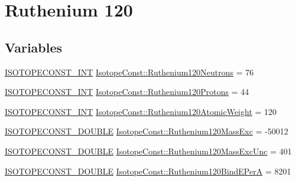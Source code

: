 \hypertarget{group___isotope_const-_ruthenium-_ru120}{}\section{Ruthenium 120}
\label{group___isotope_const-_ruthenium-_ru120}
\subsection*{Variables}
\begin{DoxyCompactItemize}
\item 
\mbox{\hyperlink{group___isotope_const-_macros_ga5f18360b3e99483a35c32d789e62621c}{I\+S\+O\+T\+O\+P\+E\+C\+O\+N\+S\+T\+\_\+\+I\+NT}} \mbox{\hyperlink{group___isotope_const-_ruthenium-_ru120_gab659be6d75e3a66b749142e8054c17be}{Isotope\+Const\+::\+Ruthenium120\+Neutrons}} = 76
\item 
\mbox{\hyperlink{group___isotope_const-_macros_ga5f18360b3e99483a35c32d789e62621c}{I\+S\+O\+T\+O\+P\+E\+C\+O\+N\+S\+T\+\_\+\+I\+NT}} \mbox{\hyperlink{group___isotope_const-_ruthenium-_ru120_ga5fb70140fa8482fc159faea49edb143c}{Isotope\+Const\+::\+Ruthenium120\+Protons}} = 44
\item 
\mbox{\hyperlink{group___isotope_const-_macros_ga5f18360b3e99483a35c32d789e62621c}{I\+S\+O\+T\+O\+P\+E\+C\+O\+N\+S\+T\+\_\+\+I\+NT}} \mbox{\hyperlink{group___isotope_const-_ruthenium-_ru120_gad471e5d0f8d793a5ae9e91594bdf4e73}{Isotope\+Const\+::\+Ruthenium120\+Atomic\+Weight}} = 120
\item 
\mbox{\hyperlink{group___isotope_const-_macros_ga8f45a7272ce02c0b4c65c44636ed719a}{I\+S\+O\+T\+O\+P\+E\+C\+O\+N\+S\+T\+\_\+\+D\+O\+U\+B\+LE}} \mbox{\hyperlink{group___isotope_const-_ruthenium-_ru120_ga2681620b25c8e2884d66f2d403cadfa4}{Isotope\+Const\+::\+Ruthenium120\+Mass\+Exc}} = -\/50012
\item 
\mbox{\hyperlink{group___isotope_const-_macros_ga8f45a7272ce02c0b4c65c44636ed719a}{I\+S\+O\+T\+O\+P\+E\+C\+O\+N\+S\+T\+\_\+\+D\+O\+U\+B\+LE}} \mbox{\hyperlink{group___isotope_const-_ruthenium-_ru120_ga860327ea1fc107da44b9853fe34c4f3c}{Isotope\+Const\+::\+Ruthenium120\+Mass\+Exc\+Unc}} = 401
\item 
\mbox{\hyperlink{group___isotope_const-_macros_ga8f45a7272ce02c0b4c65c44636ed719a}{I\+S\+O\+T\+O\+P\+E\+C\+O\+N\+S\+T\+\_\+\+D\+O\+U\+B\+LE}} \mbox{\hyperlink{group___isotope_const-_ruthenium-_ru120_gaf8b6753568b1d683d230b9311d1d135b}{Isotope\+Const\+::\+Ruthenium120\+Bind\+E\+PerA}} = 8201
\item 

\end{DoxyCompactItemize}
